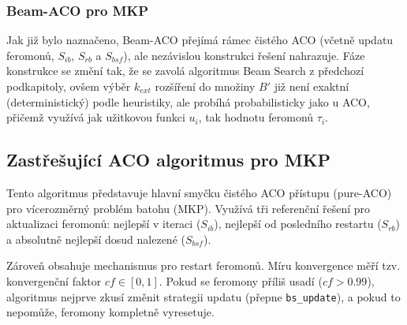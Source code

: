 \documentclass[12pt,a4paper]{article}
\theoremstyle{definition}
\begin{document}
\subsubsection{Beam-ACO pro MKP}
Jak již bylo naznačeno, Beam-ACO přejímá rámec čistého ACO (včetně updatu feromonů, $S_{ib}$, $S_{rb}$ a $S_{bsf}$), ale nezávislou konstrukci řešení nahrazuje.
Fáze konstrukce se změní tak, že se zavolá algoritmus Beam Search z předchozí podkapitoly, ovšem výběr $k_{ext}$ rozšíření do množiny $B'$ již není exaktní (deterministický) podle heuristiky, ale probíhá probabilisticky jako u ACO, přičemž využívá jak užitkovou funkci $u_i$, tak hodnotu feromonů $\tau_i$.

\subsection{Zastřešující ACO algoritmus pro MKP}

Tento algoritmus představuje hlavní smyčku čistého ACO přístupu (pure-ACO) pro vícerozměrný problém batohu (MKP). Využívá tři referenční řešení pro aktualizaci feromonů: nejlepší v iteraci ($S_{ib}$), nejlepší od posledního restartu ($S_{rb}$) a absolutně nejlepší dosud nalezené ($S_{bsf}$).

Zároveň obsahuje mechanismus pro restart feromonů. Míru konvergence měří tzv. konvergenční faktor $cf \in [0, 1]$. Pokud se feromony příliš usadí ($cf > 0.99$), algoritmus nejprve zkusí změnit strategii updatu (přepne \texttt{bs\_update}), a pokud to nepomůže, feromony kompletně vyresetuje.
\end{document}
